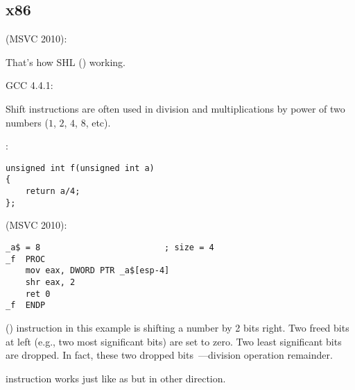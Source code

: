 \subsection{x86}

 (MSVC 2010):



{That's how SHL () working}.

 GCC 4.4.1:



{Shift instructions are often used in division and multiplications by power of two numbers 
($1$, $2$, $4$, $8$, etc).}

:

\begin{lstlisting}
unsigned int f(unsigned int a)
{
	return a/4;
};
\end{lstlisting}

 (MSVC 2010):

\begin{lstlisting}[caption=MSVC 2010]
_a$ = 8							; size = 4
_f	PROC
	mov	eax, DWORD PTR _a$[esp-4]
	shr	eax, 2
	ret	0
_f	ENDP
\end{lstlisting}

\label{SHR}
{\SHR () instruction in this example is shifting a number by 2 bits right.
Two freed bits at left (e.g., two most significant bits) are set to zero.
Two least significant bits are dropped.
In fact, these two dropped bits~---division operation remainder.}

{\SHR instruction works just like as \SHL but in other direction.}



